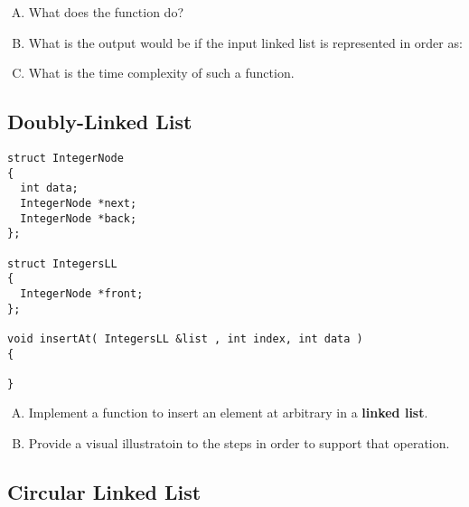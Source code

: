 \documentclass[usenames,dvipsnames]{article}
\begin{document}
\begin{question}

\begin{enumerate}[A)]
\item What does the function  do?
\item What is the output would be if the input linked list is represented in order as: 
\item What is the time complexity of such a function.
\end{enumerate}
\end{question}

\begin{solution}



\end{solution}



\subsection{Doubly-Linked List}

\begin{verbatim}
struct IntegerNode
{
  int data;
  IntegerNode *next;
  IntegerNode *back;
};

struct IntegersLL
{
  IntegerNode *front;
};

void insertAt( IntegersLL &list , int index, int data )
{
  
}
\end{verbatim}

\begin{question}
\begin{enumerate}[A)]
\item Implement a function  to insert an element at arbitrary  in a \textbf{linked list}.
\item Provide a visual illustratoin to the steps in order to support that operation.
\end{enumerate}
\end{question}
\begin{solution}

\end{solution}


\subsection{Circular Linked List}
\end{document}
